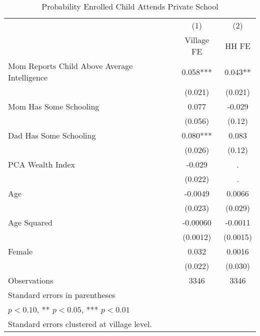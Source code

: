 \begin{table}[htbp]\centering
\def\sym#1{\ifmmode^{#1}\else\(^{#1}\)\fi}
\caption{Probability Enrolled Child Attends Private School\label{hhselection}}
\begin{tabular}{l*{2}{c}}
\toprule
                &\multicolumn{1}{c}{(1)}&\multicolumn{1}{c}{(2)}\\
                &\multicolumn{1}{c}{Village FE}&\multicolumn{1}{c}{HH FE}\\
\midrule
Mom Reports Child Above Average Intelligence&    0.058***&    0.043** \\
                &  (0.021)   &  (0.021)   \\
Mom Has Some Schooling&    0.077   &   -0.029   \\
                &  (0.056)   &   (0.12)   \\
Dad Has Some Schooling&    0.080***&    0.083   \\
                &  (0.026)   &   (0.12)   \\
PCA Wealth Index&   -0.029   &        .   \\
                &  (0.022)   &        .   \\
Age             &  -0.0049   &   0.0066   \\
                &  (0.023)   &  (0.029)   \\
Age Squared     & -0.00060   &  -0.0011   \\
                & (0.0012)   & (0.0015)   \\
Female          &    0.032   &   0.0016   \\
                &  (0.022)   &  (0.030)   \\
\midrule
Observations    &     3346   &     3346   \\
\bottomrule
\multicolumn{3}{l}{\footnotesize Standard errors in parentheses}\\
\multicolumn{3}{l}{\footnotesize * \(p<0.10\), ** \(p<0.05\), *** \(p<0.01\)}\\
\multicolumn{3}{l}{\footnotesize Standard errors clustered at village level.}\\
\end{tabular}
\end{table}
